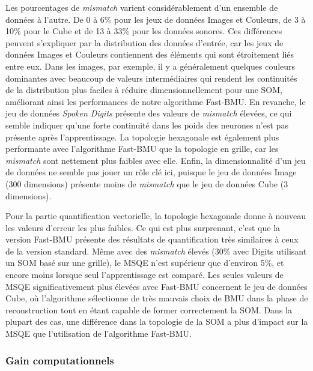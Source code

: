 	Les pourcentages de \textit{mismatch} varient considérablement d'un ensemble de données à l'autre. De 0 à 6\% pour les jeux de données Images et Couleurs, de 3 à 10\% pour le Cube et de 13 à 33\% pour les données sonores. Ces différences peuvent s'expliquer par la distribution des données d'entrée, car les jeux de données Images et Couleurs contiennent des éléments qui sont étroitement liés entre eux. Dans les images, par exemple, il y a généralement quelques couleurs dominantes avec beaucoup de valeurs intermédiaires qui rendent les continuités de la distribution plus faciles à réduire dimensionnellement pour une SOM, améliorant ainsi les performances de notre algorithme Fast-BMU. En revanche, le jeu de données \textit{Spoken Digits} présente des valeurs de \textit{mismatch} élevées, ce qui semble indiquer qu'une forte continuité dans les poids des neurones n'est pas présente après l'apprentissage. La topologie hexagonale est également plus performante avec l'algorithme Fast-BMU que la topologie en grille, car les \textit{mismatch} sont nettement plus faibles avec elle. Enfin, la dimensionnalité d'un jeu de données ne semble pas jouer un rôle clé ici, puisque le jeu de données Image (300 dimensions) présente moins de \textit{mismatch} que le jeu de données Cube (3 dimensions).

	Pour la partie quantification vectorielle, la topologie hexagonale donne à nouveau les valeurs d'erreur les plus faibles. Ce qui est plus surprenant, c'est que la version Fast-BMU présente des résultats de quantification très similaires à ceux de la version standard. Même avec des \textit{mismatch} élevés (30\% avec Digits utilisant un SOM basé sur une grille), le MSQE n'est supérieur que d'environ 5\%, et encore moins lorsque seul l'apprentissage est comparé. Les seules valeurs de MSQE significativement plus élevées avec Fast-BMU concernent le jeu de données Cube, où l'algorithme sélectionne de très mauvais choix de BMU dans la phase de reconstruction tout en étant capable de former correctement la SOM. Dans la plupart des cas, une différence dans la topologie de la SOM a plus d'impact sur la MSQE que l'utilisation de l'algorithme Fast-BMU.

	\subsubsection{Gain computationnels}\label{fast:seq:gain_comput}

